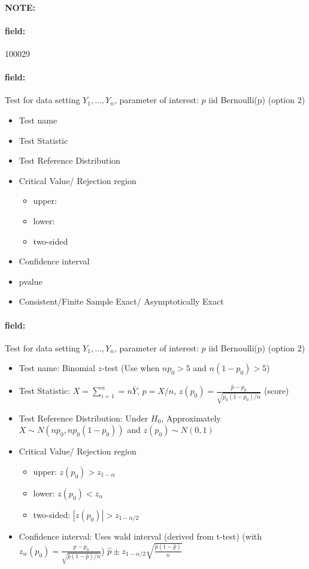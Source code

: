 \documentclass[12pt]{article}
\newenvironment{note}{\paragraph{NOTE:}}{}
\newenvironment{field}{\paragraph{field:}}{}
\begin{document}
\begin{note} \begin{field} \tiny 100029 \end{field}
 \begin{field}
  Test for data setting $Y_1, \ldots, Y_n$, parameter of interest: $p$ iid Bernoulli(p) (option 2)
  \begin{itemize}
   \item Test name
   \item Test Statistic
   \item Test Reference Distribution
   \item Critical Value/ Rejection region
         \begin{itemize}
          \item upper:
          \item lower:
          \item two-sided
         \end{itemize}
   \item Confidence interval
   \item pvalue
   \item Consistent/Finite Sample Exact/ Asymptotically Exact
  \end{itemize}
 \end{field}
 \begin{field}
  Test for data setting $Y_1, \ldots, Y_n$, parameter of interest: $p$ iid Bernoulli(p) (option 2)
  \begin{itemize}
   \item Test name: Binomial $z$-test (Use when $np_0 > 5$ and $n(1-p_0) > 5$)
   \item Test Statistic: $X  = \sum_{i=1}^n = n\bar{Y}$, $\hat{p} = X/n$, $z(p_0) = \frac{\hat{p}- p_0}{\sqrt{p_0(1-p_0)/n}}$ (score)
   \item Test Reference Distribution: Under $H_0$, Approximately $X \sim N(np_0,np_0(1-p_0))$ and $z(p_0) \sim N(0,1)$
   \item Critical Value/ Rejection region
         \begin{itemize}
          \item upper: $z(p_0) > z_{1-\alpha}$
          \item lower: $z(p_0) < z_\alpha$
          \item two-sided: $|z(p_0)| > z_{1-\alpha/2}$
         \end{itemize}
   \item Confidence interval: Uses wald interval (derived from t-test) (with $z_w(p_0) = \frac{\hat{p} - p_0}{\sqrt{\hat{p}(1 - \hat{p})/n}}$) $\hat{p} \pm z_{1-\alpha/2}\sqrt{\frac{\hat{p}(1 - \hat{p})}{n}}$

\end{itemize}
\end{field}
\end{note}
\end{document}
